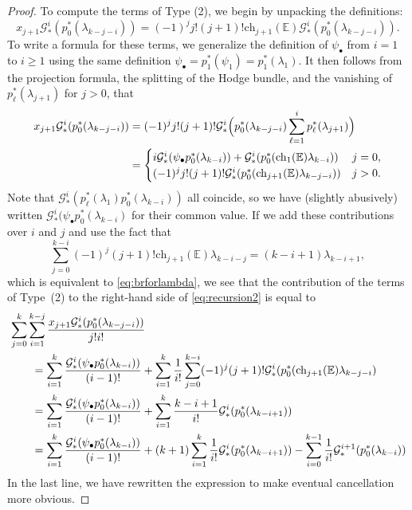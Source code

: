 \documentclass[12pt]{amsart}
\theoremstyle{definition}
\newcommand{\bE}{\mathbb{E}}
\newcommand{\G}{\mathcal{G}}
\newcommand{\ch}{\mathrm{ch}}
\numberwithin{equation}{section}
\begin{document}
\begin{proof}
To compute the terms of Type (2), we begin by unpacking the definitions:
\[
x_{j+1}\G_*^{i}(p_0^*(\lambda_{k-j-i}))=(-1)^{j}j!(j+1)!\ch_{j+1}(\bE)\G_*^{i}(p_0^*(\lambda_{k-j-i})).
\]
To write a formula for these terms, we generalize the definition of $\psi_\bullet$ from $i=1$ to $i\geq 1$ using the same definition $\psi_\bullet=p_1^*(\psi_1)=p_1^*(\lambda_1)$. It then follows from the projection formula, the splitting of the Hodge bundle, and the vanishing of $p_\ell^*(\lambda_{j+1})$ for $j > 0$, that
\[
	\begin{aligned}
		x_{j+1}\G_*^{i}(p_0^*(\lambda_{k-j-i}))&=
(-1)^j j! (j+1)! \G_*^i\Bigl(p_0^*(\lambda_{k-j-i})\sum_{\ell=1}^i p_\ell^\ast(\lambda_{j+1})\Bigr) 
		\\ &=
\begin{cases}
i\G_*^i(\psi_\bullet p_0^*(\lambda_{k-i}))+\G_*^i(p_0^*(\ch_{1}(\bE)\lambda_{k-i})) & j=0,\\
(-1)^jj!(j+1)!\G_*^i(p_0^*(\ch_{j+1}(\bE)\lambda_{k-j-i})) & j >  0.
\end{cases}
	\end{aligned}
\]
Note that $\G_*^i(p_\ell^*(\lambda_1)p_0^*(\lambda_{k-i}))$ all coincide, so we have (slightly abusively) written $\G_*^i(\psi_\bullet p_0^*(\lambda_{k-i})$ for their common value.  If we add these contributions over $i$ and $j$ and use the fact that
\[
\sum_{j=0}^{k-i}(-1)^j(j+1)!\ch_{j+1}(\bE)\lambda_{k-i-j}=(k-i+1)\lambda_{k-i+1},
\]
which is equivalent to \eqref{eq:brforlambda}, we see that the contribution of the terms of Type~(2) to the right-hand side of \eqref{eq:recursion2} is equal to
\begin{align}
	\notag& \sum_{j=0}^k\sum_{i=1}^{k-j}\frac{x_{j+1}\G_*^{i}(p_0^*(\lambda_{k-j-i}))}{j!i!}
	\\ \notag & \qquad =\sum_{i=1}^k\frac{\G_*^i(\psi_\bullet p_0^*(\lambda_{k-i}))}{(i-1)!}+\sum_{i=1}^k \frac{1}{i!} \sum_{j=0}^{k-i} (-1)^j (j+1)! \G_*^i(p_0^*(\ch_{j+1}(\bE)\lambda_{k-j-i})
	\\ \notag & \qquad =\sum_{i=1}^k\frac{\G_*^i(\psi_\bullet p_0^*(\lambda_{k-i}))}{(i-1)!}+\sum_{i=1}^{k}\frac{k-i+1}{i!}\G_*^i(p_0^*(\lambda_{k-i+1}))
	\\ \label{eq:recursiontype2} & \qquad =\sum_{i=1}^k\frac{\G_*^i(\psi_\bullet p_0^*(\lambda_{k-i}))}{(i-1)!}+(k+1) \sum_{i=1}^{k}\frac{1}{i!}\G_*^i(p_0^*(\lambda_{k-i+1}))-\sum_{i=0}^{k-1}\frac{1}{i!} \G_*^{i+1}(p_0^*(\lambda_{k-i}))
\end{align}
In the last line, we have rewritten the expression to make eventual cancellation more obvious.  


\end{proof}
\end{document}
